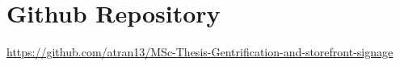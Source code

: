\documentclass[ds, nofrontpicture, nofirstcompanypicture, nosecondcompanypicture]{mscthesis}
\begin{document}
\section*{Github Repository}
\url{https://github.com/atran13/MSc-Thesis-Gentrification-and-storefront-signage}












\newpage

\end{document}
